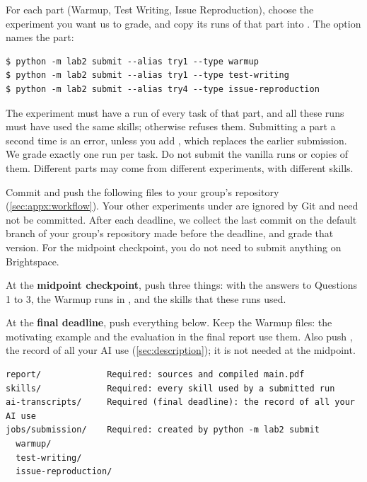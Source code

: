 \documentclass[letterpaper,11pt]{article}
\begin{document}
For each part (Warmup, Test Writing, Issue Reproduction), choose the experiment
you want us to grade, and copy its runs of that part into
. The option  names the part:

\begin{verbatim}
$ python -m lab2 submit --alias try1 --type warmup
$ python -m lab2 submit --alias try1 --type test-writing
$ python -m lab2 submit --alias try4 --type issue-reproduction
\end{verbatim}

The experiment must have a run of every task of that part, and all these
runs must have used the same skills; otherwise  refuses them. Submitting a part a second time is an error, unless you add , which
replaces the earlier submission. We grade exactly one run per task. Do not submit the vanilla runs or copies of them. Different
parts may come from different experiments, with different skills.

Commit and push the following files to your group's repository (\autoref{sec:appx:workflow}). Your other
experiments under  are ignored by Git and need not be committed. After
each deadline, we collect the last commit on the default branch of your
group's repository made before the deadline, and grade that version. For the
midpoint checkpoint, you do not need to submit anything on Brightspace.

\squishlist
 \item At the \textbf{midpoint checkpoint}, push three things: 
   with the answers to Questions 1 to 3, the Warmup runs in
   , and the skills that these runs used.
 \item At the \textbf{final deadline}, push everything below. Keep the
   Warmup files: the motivating example and the evaluation in the final
   report use them. Also push , the record of all your AI
   use (\autoref{sec:description}); it is not needed at the midpoint.
\squishend

\medskip
\noindent\begin{minipage}{\textwidth}
\begin{verbatim}
report/             Required: sources and compiled main.pdf
skills/             Required: every skill used by a submitted run
ai-transcripts/     Required (final deadline): the record of all your AI use
jobs/submission/    Required: created by python -m lab2 submit
  warmup/
  test-writing/
  issue-reproduction/
\end{verbatim}
\end{minipage}
\end{document}

